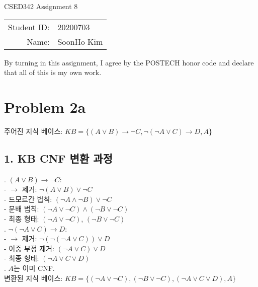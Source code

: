 \documentclass[12pt]{article}
\begin{document}
\begin{center}
{\Large CSED342 Assignment 8 \vspace{10pt}}

\begin{tabular}{rl}
Student ID: & 20200703 \\
Name: & SoonHo Kim \\
\end{tabular}
\end{center}

\begin{center}
By turning in this assignment, I agree by the POSTECH honor code and declare that all of this is my own work.
\end{center}

{\fontsize{10}{13}\selectfont
\section*{Problem 2a}

주어진 지식 베이스: \( KB = \{ (A \lor B) \rightarrow \neg C, \neg(\neg A \lor C) \rightarrow D, A \} \)

\subsection*{1. KB CNF 변환 과정}

. \((A \lor B) \rightarrow \neg C\): \\
   - \(\rightarrow\) 제거: \(\neg(A \lor B) \lor \neg C\) \\
   - 드모르간 법칙: \((\neg A \land \neg B) \lor \neg C\) \\
   - 분배 법칙: \((\neg A \lor \neg C) \land (\neg B \lor \neg C)\) \\
   - 최종 형태: \((\neg A \lor \neg C)\), \((\neg B \lor \neg C)\) \\

. \(\neg(\neg A \lor C) \rightarrow D\): \\
   - \(\rightarrow\) 제거: \(\neg(\neg(\neg A \lor C)) \lor D\) \\
   - 이중 부정 제거: \((\neg A \lor C) \lor D\) \\
   - 최종 형태: \((\neg A \lor C \lor D)\) \\

. \(A\)는 이미 CNF. \\

\noindent 변환된 지식 베이스: \( KB = \{ (\neg A \lor \neg C), (\neg B \lor \neg C), (\neg A \lor C \lor D), A \} \)

}
\end{document}
